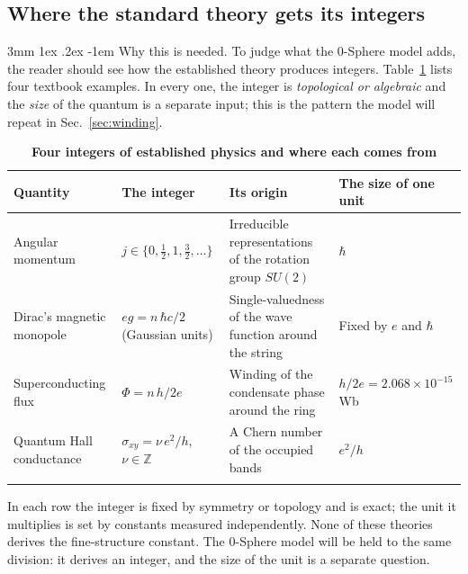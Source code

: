 \documentclass[%
 reprint, amsmath,amssymb, aps, prb, ]{revtex4-2}
\makeatletter
\numberwithin{equation}{section}
\renewcommand\paragraph{%
  \@startsection{paragraph}{4}{\z@}%
    {3mm \@plus 1ex \@minus .2ex}
    {-1em}
    {\normalfont\normalsize\itshape}}
\makeatother
\begin{document}
\subsection{Where the standard theory gets its integers}

\paragraph{Why this is needed.} To judge what the 0-Sphere model adds, the reader should see how the established theory produces integers. Table~\ref{tab:stdints} lists four textbook examples. In every one, the integer is \emph{topological or algebraic} and the \emph{size} of the quantum is a separate input; this is the pattern the model will repeat in Sec.~\ref{sec:winding}.

\begin{table}[t!]
\centering
\caption{\textbf{Four integers of established physics and where each comes from}}
\label{tab:stdints}
\renewcommand{\arraystretch}{1.4}
\begin{tabular}{p{3.4cm}p{4.2cm}p{4.2cm}p{3.8cm}}
\toprule
\textbf{Quantity} & \textbf{The integer} & \textbf{Its origin} & \textbf{The size of one unit} \\
\midrule
Angular momentum
& $j\in\{0,\tfrac12,1,\tfrac32,\dots\}$
& Irreducible representations of the rotation group $SU(2)$~\cite{ref:sakurai}
& $\hbar$ \\
\addlinespace[0.3cm]
Dirac's magnetic monopole
& $eg=n\,\hbar c/2$ (Gaussian units)
& Single-valuedness of the wave function around the string~\cite{ref:dirac31}
& Fixed by $e$ and $\hbar$ \\
\addlinespace[0.3cm]
Superconducting flux
& $\Phi=n\,h/2e$
& Winding of the condensate phase around the ring~\cite{ref:london,ref:deaver,ref:doll}
& $h/2e=2.068\times10^{-15}$ Wb \\
\addlinespace[0.3cm]
Quantum Hall conductance
& $\sigma_{xy}=\nu\,e^2/h$, $\nu\in\mathbb{Z}$
& A Chern number of the occupied bands~\cite{ref:klitzing,ref:tknn}
& $e^2/h$ \\
\addlinespace[0.2cm]
\bottomrule
\end{tabular}
\vspace{0.2cm}
\begin{minipage}{0.95\textwidth}
\justifying\footnotesize
In each row the integer is fixed by symmetry or topology and is exact; the unit it multiplies is set by constants measured independently. None of these theories derives the fine-structure constant. The 0-Sphere model will be held to the same division: it derives an integer, and the size of the unit is a separate question.
\end{minipage}
\end{table}
\end{document}
